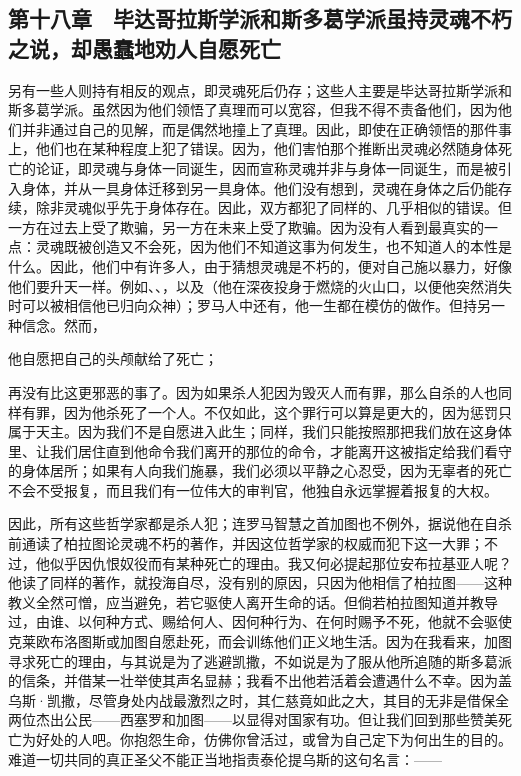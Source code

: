 
\subsection{第十八章　毕达哥拉斯学派和斯多葛学派虽持灵魂不朽之说，却愚蠢地劝人自愿死亡}

另有一些人则持有相反的观点，即灵魂死后仍存；这些人主要是毕达哥拉斯学派和斯多葛学派。虽然因为他们领悟了真理而可以宽容，但我不得不责备他们，因为他们并非通过自己的见解，而是偶然地撞上了真理。因此，即使在正确领悟的那件事上，他们也在某种程度上犯了错误。因为，他们害怕那个推断出灵魂必然随身体死亡的论证，即灵魂与身体一同诞生，因而宣称灵魂并非与身体一同诞生，而是被引入身体，并从一具身体迁移到另一具身体。他们没有想到，灵魂在身体之后仍能存续，除非灵魂似乎先于身体存在。因此，双方都犯了同样的、几乎相似的错误。但一方在过去上受了欺骗，另一方在未来上受了欺骗。因为没有人看到最真实的一点：灵魂既被创造又不会死，因为他们不知道这事为何发生，也不知道人的本性是什么。因此，他们中有许多人，由于猜想灵魂是不朽的，便对自己施以暴力，好像他们要升天一样。例如、、，以及（他在深夜投身于燃烧的火山口，以便他突然消失时可以被相信他已归向众神）；罗马人中还有，他一生都在模仿的做作。但持另一种信念。然而，\par

他自愿把自己的头颅献给了死亡；\par

再没有比这更邪恶的事了。因为如果杀人犯因为毁灭人而有罪，那么自杀的人也同样有罪，因为他杀死了一个人。不仅如此，这个罪行可以算是更大的，因为惩罚只属于天主。因为我们不是自愿进入此生；同样，我们只能按照那把我们放在这身体里、让我们居住直到他命令我们离开的那位的命令，才能离开这被指定给我们看守的身体居所；如果有人向我们施暴，我们必须以平静之心忍受，因为无辜者的死亡不会不受报复，而且我们有一位伟大的审判官，他独自永远掌握着报复的大权。\par

因此，所有这些哲学家都是杀人犯；连罗马智慧之首加图也不例外，据说他在自杀前通读了柏拉图论灵魂不朽的著作，并因这位哲学家的权威而犯下这一大罪；不过，他似乎因仇恨奴役而有某种死亡的理由。我又何必提起那位安布拉基亚人呢？他读了同样的著作，就投海自尽，没有别的原因，只因为他相信了柏拉图——这种教义全然可憎，应当避免，若它驱使人离开生命的话。但倘若柏拉图知道并教导过，由谁、以何种方式、赐给何人、因何种行为、在何时赐予不死，他就不会驱使克莱欧布洛图斯或加图自愿赴死，而会训练他们正义地生活。因为在我看来，加图寻求死亡的理由，与其说是为了逃避凯撒，不如说是为了服从他所追随的斯多葛派的信条，并借某一壮举使其声名显赫；我看不出他若活着会遭遇什么不幸。因为盖乌斯·凯撒，尽管身处内战最激烈之时，其仁慈竟如此之大，其目的无非是借保全两位杰出公民——西塞罗和加图——以显得对国家有功。但让我们回到那些赞美死亡为好处的人吧。你抱怨生命，仿佛你曾活过，或曾为自己定下为何出生的目的。难道一切共同的真正圣父不能正当地指责泰伦提乌斯的这句名言：——\par

